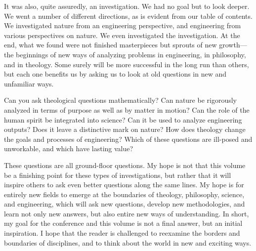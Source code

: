 It was also, quite assuredly, an investigation.  We had no goal but to look deeper.  We went a number of different directions, as is evident from our table of contents.  We investigated nature from an engineering perspective, and engineering from various perspectives on nature.  We even investigated the investigation.  At the end, what
we found were not finished masterpieces but sprouts of new growth---the beginnings of new ways of analyzing problems in engineering, in philosophy, and in theology.  Some surely will be more successful in the long run than others, but each one benefits us by asking us to look at old questions in new and unfamiliar ways.

Can you ask theological questions mathematically?  Can nature be rigorously analyzed in terms of purpose as well as by matter in motion?  Can the role of the human spirit be integrated into science?  Can it be used to analyze engineering outputs?  Does it leave a distinctive mark on nature?  How does theology change the goals and processes of engineering?  Which of these questions are ill-posed and unworkable, and which have lasting value?

These questions are all ground-floor questions.  My hope is not that this volume be a finishing point for these types of investigations, but rather that it will inspire others to ask even better questions along the same lines.  My hope is for entirely new fields to emerge at the boundaries of theology, philosophy, science, and engineering, which will ask new questions, develop new methodologies, and learn not only new answers, but also entire new ways of understanding.  In short, my goal for the conference and this volume is not a final answer, but an initial inspiration.  I hope that the reader is challenged to reexamine the borders and boundaries of disciplines, and to think about the world in new and exciting ways.
